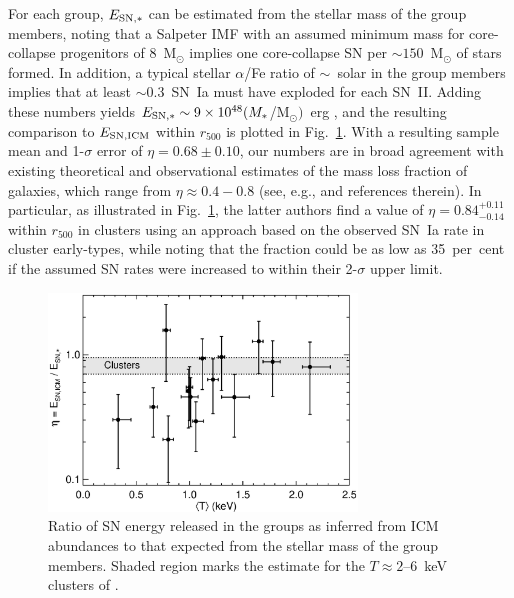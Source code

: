 \documentclass[useAMS,usenatbib]{mn2e}
\begin{document}
For each group, $E_{\rm SN, \ast}$ can be estimated from the stellar
mass of the group members, noting that a Salpeter IMF with an assumed
minimum mass for core-collapse progenitors of 8~M$_\odot$ implies one
core-collapse SN per $\sim 150$~M$_\odot$ of stars formed. In
addition, a typical stellar $\alpha$/Fe ratio of $\sim$~solar in the
group members \citep{hump06} implies that at least $\sim 0.3$~SN~Ia
must have exploded for each SN~II. Adding these numbers yields $E_{\rm
SN, \ast} \sim 9\times 10^{48} (M_\ast$/M$_\odot)$~erg , and the
resulting comparison to $E_{\rm SN,ICM}$ within $r_{500}$ is plotted
in Fig.~\ref{fig,release}. With a resulting sample mean and 1-$\sigma$
error of $\eta= 0.68\pm 0.10$, our numbers are in broad agreement with
existing theoretical and observational estimates of the mass loss
fraction of galaxies, which range from $\eta \approx 0.4-0.8$ (see,
e.g., \citealt{siva09} and references therein). In particular, as
illustrated in Fig.~\ref{fig,release}, the latter authors find a value
of $\eta = 0.84^{+0.11}_{-0.14}$ within $r_{500}$ in clusters using an
approach based on the observed SN~Ia rate in cluster early-types,
while noting that the fraction could be as low as 35~per~cent if the
assumed SN rates were increased to within their 2-$\sigma$ upper
limit.


\begin{figure} 
 \hspace{0mm} \includegraphics[width=82mm]{fig15.eps}
 \caption{Ratio of SN energy released in the groups as inferred from
    ICM abundances to that expected from the stellar mass of the group
    members. Shaded region marks the estimate for the $T\approx
    2$--6~keV clusters of \citet{siva09}.}
\label{fig,release} 
\end{figure}  
\end{document}

